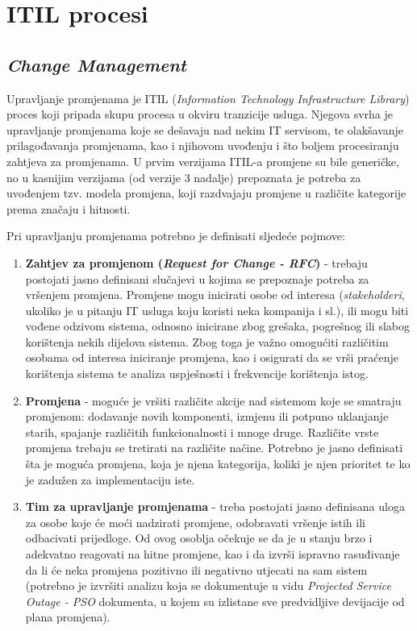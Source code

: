 \documentclass[12pt,a4paper]{article}
\begin{document}


\tableofcontents

\newpage


\section{ITIL procesi}

\subsection{\textit{Change Management}}

\quad Upravljanje promjenama je ITIL (\textit{Information Technology Infrastructure Library}) proces koji pripada skupu procesa u okviru tranzicije usluga. Njegova svrha je upravljanje promjenama koje se dešavaju nad nekim IT servisom, te olakšavanje prilagođavanja promjenama, kao i njihovom uvođenju i što boljem procesiranju zahtjeva za promjenama. U prvim verzijama ITIL-a promjene su bile generičke, no u kasnijim verzijama (od verzije 3 nadalje) prepoznata je potreba za uvođenjem tzv. modela promjena, koji razdvajaju promjene u različite kategorije prema značaju i hitnosti.

Pri upravljanju promjenama potrebno je definisati sljedeće pojmove:

\begin{enumerate}
\item \textbf{Zahtjev za promjenom (\textit{Request for Change - RFC})} - trebaju postojati jasno definisani slučajevi u kojima se prepoznaje potreba za vršenjem promjena. Promjene mogu inicirati osobe od interesa (\textit{stakeholderi}, ukoliko je u pitanju IT usluga koju koristi neka kompanija i sl.), ili mogu biti vođene odzivom sistema, odnosno inicirane zbog grešaka, pogrešnog ili slabog korištenja nekih dijelova sistema. Zbog toga je važno omogućiti različitim osobama od interesa iniciranje promjena, kao i osigurati da se vrši praćenje korištenja sistema te analiza uspješnosti i frekvencije korištenja istog.

\item \textbf{Promjena} -  moguće je vršiti različite akcije nad sistemom koje se smatraju promjenom: dodavanje novih komponenti, izmjenu ili potpuno uklanjanje starih, spajanje različitih funkcionalnosti i mnoge druge. Različite vrste promjena trebaju se tretirati na različite načine. Potrebno je jasno definisati šta je moguća promjena, koja je njena kategorija, koliki je njen prioritet te ko je zadužen za implementaciju iste.

\item \textbf{Tim za upravljanje promjenama} - treba postojati jasno definisana uloga za osobe koje će moći nadzirati promjene, odobravati vršenje istih ili odbacivati prijedloge. Od ovog osoblja očekuje se da je u stanju brzo i adekvatno reagovati na hitne promjene, kao i da izvrši ispravno rasuđivanje da li će neka promjena pozitivno ili negativno utjecati na sam sistem (potrebno je izvršiti analizu koja se dokumentuje u vidu \textit{Projected Service Outage - PSO} dokumenta, u kojem su izlistane sve predvidljive devijacije od plana promjena).
\end{enumerate}
\end{document}
